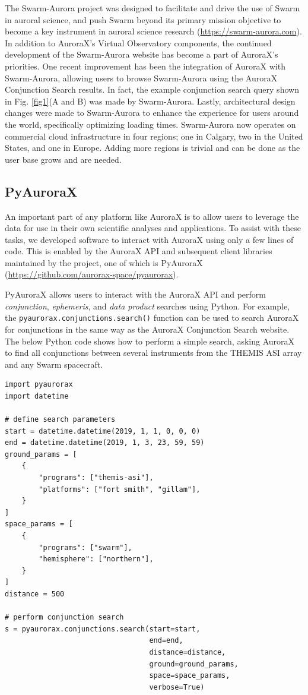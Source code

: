 \documentclass[utf8]{FrontiersinHarvard} %
\begin{document}
The Swarm-Aurora project was designed to facilitate and drive the use of Swarm \citep{Friis2006} in auroral science, and push Swarm beyond its primary mission objective to become a key instrument in auroral science research (\url{https://swarm-aurora.com}). In addition to AuroraX's Virtual Observatory components, the continued development of the Swarm-Aurora website has become a part of AuroraX’s priorities. One recent improvement has been the integration of AuroraX with Swarm-Aurora, allowing users to browse Swarm-Aurora using the AuroraX Conjunction Search results. In fact, the example conjunction search query shown in Fig. \ref{fig1}(A and B) was made by Swarm-Aurora. Lastly, architectural design changes were made to Swarm-Aurora to enhance the experience for users around the world, specifically optimizing loading times. Swarm-Aurora now operates on commercial cloud infrastructure in four regions; one in Calgary, two in the United States, and one in Europe. Adding more regions is trivial and can be done as the user base grows and are needed.

\subsection{PyAuroraX}
An important part of any platform like AuroraX is to allow users to leverage the data for use in their own scientific analyses and applications. To assist with these tasks, we developed software to interact with AuroraX using only a few lines of code. This is enabled by the AuroraX API and subsequent client libraries maintained by the project, one of which is PyAuroraX (\url{https://github.com/aurorax-space/pyaurorax}).

PyAuroraX allows users to interact with the AuroraX API and perform \textit{conjunction}, \textit{ephemeris}, and \textit{data product} searches using Python. For example, the \verb|pyaurorax.conjunctions.search()| function can be used to search AuroraX for conjunctions in the same way as the AuroraX Conjunction Search website. The below Python code shows how to perform a simple search, asking AuroraX to find all conjunctions between several instruments from the THEMIS ASI array and any Swarm spacecraft.

\begin{verbatim}
import pyaurorax
import datetime

# define search parameters
start = datetime.datetime(2019, 1, 1, 0, 0, 0)
end = datetime.datetime(2019, 1, 3, 23, 59, 59)
ground_params = [
    {
        "programs": ["themis-asi"],
        "platforms": ["fort smith", "gillam"],
    }
]
space_params = [
    {
        "programs": ["swarm"],
        "hemisphere": ["northern"],
    }
]
distance = 500

# perform conjunction search
s = pyaurorax.conjunctions.search(start=start,
                                  end=end,
                                  distance=distance,
                                  ground=ground_params,
                                  space=space_params,
                                  verbose=True)
\end{verbatim}
\end{document}
